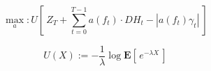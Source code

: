 \documentclass{article}
\begin{document}
$$ \max_{a}: U\!\left[ \
        Z_T + \sum_{t=0}^{T-1} a(f_t) \cdot DH_t - | a(f_t)\gamma_t|
     \ \right]  $$
     
$$
	U(X) := - \frac1\lambda \log \mathrm{ \mathbf{E}}\!\left[\,
		e^{ - \lambda X }	
\,\right] 
$$
\end{document}
